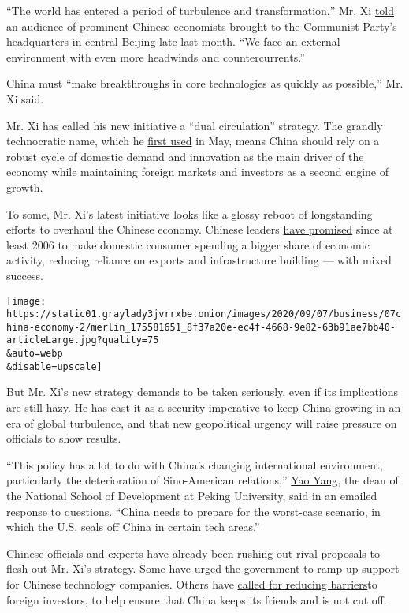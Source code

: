 ``The world has entered a period of turbulence and transformation,'' Mr.
Xi
\href{http://www.xinhuanet.com/politics/leaders/2020-08/24/c_1126407763.htm}{told
an audience of prominent Chinese economists} brought to the Communist
Party's headquarters in central Beijing late last month. ``We face an
external environment with even more headwinds and countercurrents.''

China must ``make breakthroughs in core technologies as quickly as
possible,'' Mr. Xi said.

Mr. Xi has called his new initiative a ``dual circulation'' strategy.
The grandly technocratic name, which he
\href{http://www.xinhuanet.com/politics/leaders/2020-05/14/c_1125986000.htm}{first
used} in May, means China should rely on a robust cycle of domestic
demand and innovation as the main driver of the economy while
maintaining foreign markets and investors as a second engine of growth.

To some, Mr. Xi's latest initiative looks like a glossy reboot of
longstanding efforts to overhaul the Chinese economy. Chinese leaders
\href{https://www.chinadaily.com.cn/china/2007-03/02/content_818091_4.htm}{have
promised} since at least 2006 to make domestic consumer spending a
bigger share of economic activity, reducing reliance on exports and
infrastructure building --- with mixed success.

\texttt{[image: https://static01.graylady3jvrrxbe.onion/images/2020/09/07/business/07china-economy-2/merlin\_175581651\_8f37a20e-ec4f-4668-9e82-63b91ae7bb40-articleLarge.jpg?quality=75\\\&auto=webp\\\&disable=upscale]}

But Mr. Xi's new strategy demands to be taken seriously, even if its
implications are still hazy. He has cast it as a security imperative to
keep China growing in an era of global turbulence, and that new
geopolitical urgency will raise pressure on officials to show results.

``This policy has a lot to do with China's changing international
environment, particularly the deterioration of Sino-American
relations,''
\href{https://en.nsd.pku.edu.cn/faculty/fulltime/y/239558.htm}{Yao
Yang}, the dean of the National School of Development at Peking
University, said in an emailed response to questions. ``China needs to
prepare for the worst-case scenario, in which the U.S. seals off China
in certain tech areas.''

Chinese officials and experts have already been rushing out rival
proposals to flesh out Mr. Xi's strategy. Some have urged the government
to \href{https://www.sohu.com/a/414506166_729263}{ramp up support} for
Chinese technology companies. Others have
\href{http://www.aisixiang.com/data/122269.html}{called for reducing
barriers}to foreign investors, to help ensure that China keeps its
friends and is not cut off.

